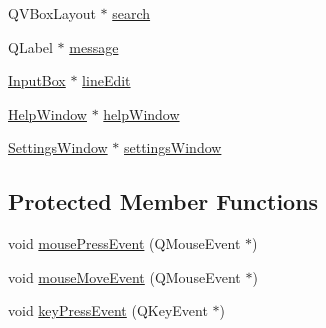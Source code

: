 \begin{DoxyCompactItemize}
\item 
Q\+V\+Box\+Layout $\ast$ \hyperlink{class_do_lah_1_1_do_lah_u_i_ab6f1b0d5fa9fffb3b2ad646cca24e59d}{search}
\item 
Q\+Label $\ast$ \hyperlink{class_do_lah_1_1_do_lah_u_i_afc7d0c0d69f83429565b6a08c3deb88f}{message}
\item 
\hyperlink{class_do_lah_1_1_input_box}{Input\+Box} $\ast$ \hyperlink{class_do_lah_1_1_do_lah_u_i_a866af0cd300b3a0194e9281fcc6b667f}{line\+Edit}
\item 
\hyperlink{class_do_lah_1_1_help_window}{Help\+Window} $\ast$ \hyperlink{class_do_lah_1_1_do_lah_u_i_a435b62b51e443bcb7e278df944803504}{help\+Window}
\item 
\hyperlink{class_do_lah_1_1_settings_window}{Settings\+Window} $\ast$ \hyperlink{class_do_lah_1_1_do_lah_u_i_a6c2dbfa303d362fa574b6dd4fcea9afd}{settings\+Window}
\end{DoxyCompactItemize}
\subsection*{Protected Member Functions}
\begin{DoxyCompactItemize}
\item 
void \hyperlink{class_do_lah_1_1_do_lah_u_i_a986e56315e8e9460e9618d0559d27a23}{mouse\+Press\+Event} (Q\+Mouse\+Event $\ast$)
\item 
void \hyperlink{class_do_lah_1_1_do_lah_u_i_a836e2b2809d6b7e0ea8772da83371f5b}{mouse\+Move\+Event} (Q\+Mouse\+Event $\ast$)
\item 
void \hyperlink{class_do_lah_1_1_do_lah_u_i_aa4977f2b2f72f9f04e1a8b1a7444b918}{key\+Press\+Event} (Q\+Key\+Event $\ast$)
\end{DoxyCompactItemize}
